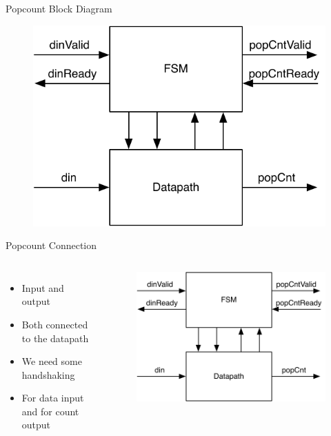 \begin{frame}[fragile]{Popcount Block Diagram}

\begin{figure}
  \includegraphics[scale=\scale]{../figures/popcnt-fsmd}
\end{figure}
\end{frame}


\begin{frame}[fragile]{Popcount Connection}
\begin{columns}
\begin{itemize}
\item Input  and output 
\item Both connected to the datapath
\item We need some handshaking
\item For data input and for count output
\end{itemize}
\begin{figure}
  \includegraphics[scale=0.45]{../figures/popcnt-fsmd}
\end{figure}
\end{columns}
\end{frame}

